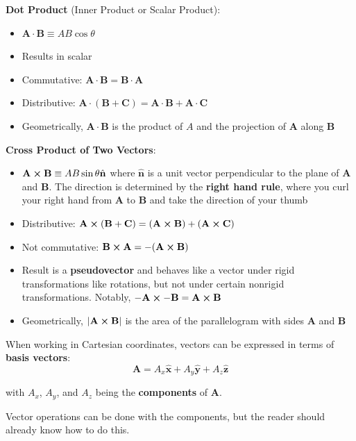 \documentclass{article}
\begin{document}
\textbf{Dot Product} (Inner Product or Scalar Product):
\begin{itemize}
    \item \(\mathbf{A} \cdot \mathbf{B} \equiv AB\cos{\theta}\) 
    \item Results in scalar
    \item Commutative: \(\mathbf{A} \cdot \mathbf{B} =\mathbf{B} \cdot \mathbf{A} \)
    \item Distributive: \(\mathbf{A} \cdot (\mathbf{B} +\mathbf{C} )=\mathbf{A} \cdot \mathbf{B} +\mathbf{A} \cdot \mathbf{C} \)
    \item Geometrically, \(\mathbf{A} \cdot \mathbf{B} \) is the product of \(A\) and the projection of \(\mathbf{A} \) along \(\mathbf{B} \)    
\end{itemize}

\textbf{Cross Product of Two Vectors}:
\begin{itemize}
    \item \(\mathbf{A} \cross  \mathbf{B} \equiv AB\sin{\theta}\hat{\mathbf{n}}\) where \(\mathbf{\hat{n}}\) is a unit vector perpendicular to the plane of \(\mathbf{A} \) and \(\mathbf{B} \). The direction is determined by the \textbf{right hand rule}, where you curl your right hand from \(\mathbf{A} \) to \(\mathbf{B} \) and take the direction of your thumb
    \item Distributive: \(\mathbf{A} \cross (\mathbf{B}+\mathbf{C})=(\mathbf{A} \cross \mathbf{B} )+(\mathbf{A} \cross \mathbf{C} ) \)
    \item Not commutative: \(\mathbf{B} \cross \mathbf{A} =-(\mathbf{A} \cross \mathbf{B} )\)
    \item Result is a \textbf{pseudovector} and behaves like a vector under rigid transformations like rotations, but not under certain nonrigid transformations. Notably, \(-\mathbf{A} \cross -\mathbf{B} =\mathbf{A} \cross \mathbf{B} \)
    \item Geometrically, \(\lvert \mathbf{A} \cross \mathbf{B} \rvert \) is the area of the parallelogram with sides \(\mathbf{A} \) and \(\mathbf{B} \)  
\end{itemize}

When working in Cartesian coordinates, vectors can be expressed in terms of \textbf{basis vectors}:
\[
    \mathbf{A} =A_x \hat{\mathbf{x}}+A_y \mathbf{\hat{y}} +A_z \mathbf{\hat{z}}  
\]

with \(A_x\), \(A_y\), and \(A_z\) being the \textbf{components} of \(\mathbf{A} \).

Vector operations can be done with the components, but the reader should already know how to do this.
\end{document}
